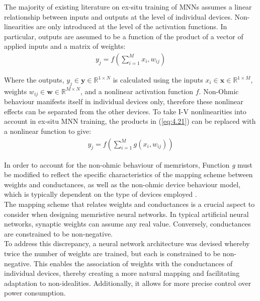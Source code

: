 \noindent The majority of existing literature on ex-situ training of MNNs assumes a linear relationship between inputs and outputs at the level of individual devices. Non-linearities are only introduced at the level of the activation functions. In particular, outputs are assumed to be a function of the product of a vector of applied inputs and a matrix of weights:
\begin{align}
y_j = f\left( \sum_{i=1}^{M} x_i, w_{ij} \right) \label{eq:4.21}
\end{align}

\noindent Where the outputs, $y_j \in \textbf{y} \in \mathbb{R}^{1 \times N}$ is calculated using the inputs $x_i \in \textbf{x} \in \mathbb{R}^{1 \times M}$, weights $w_{ij} \in \textbf{w} \in \mathbb{R}^{M \times N}$, and a nonlinear activation function $f$. Non-Ohmic behaviour manifests itself in individual devices only, therefore these nonlinear effects can be separated from the other devices. To take I-V nonlinearities into account in ex-situ MNN training, the products in (\ref{eq:4.21}) can be replaced with a nonlinear function to give:
\begin{align}
y_j = f\left( \sum_{i=1}^{M} g \left( x_i, w_{ij} \right) \right) \label{eq:4.22}
\end{align}

\noindent In order to account for the non-ohmic behaviour of memristors, Function \textit{g} must be modified to reflect the specific characteristics of the mapping scheme between weights and conductances, as well as the non-ohmic device behaviour model, which is typically dependent on the type of devices employed \cite{joksas2022nonideality}.\\

\noindent The mapping scheme that relates weights and conductances is a crucial aspect to consider when designing memristive neural networks. In typical artificial neural networks, synaptic weights can assume any real value. Conversely, conductances are constrained to be non-negative.\\

\noindent To address this discrepancy, a neural network architecture was devised whereby twice the number of weights are trained, but each is constrained to be non-negative. This enables the association of weights with the conductances of individual devices, thereby creating a more natural mapping and facilitating adaptation to non-idealities. Additionally, it allows for more precise control over power consumption.\\

